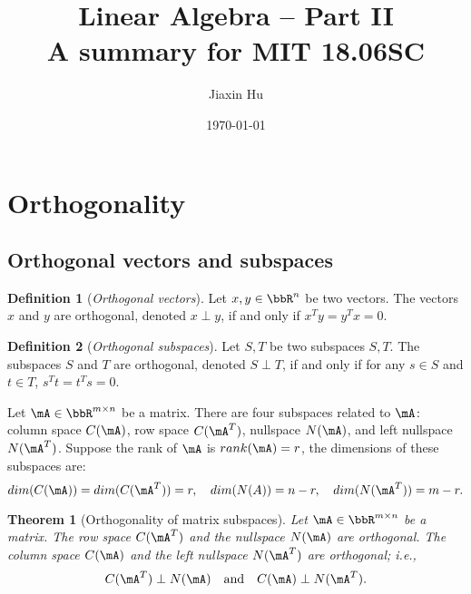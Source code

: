 \documentclass[11pt]{article}
\title{\textbf{Linear Algebra -- Part II}\\A summary for MIT 18.06SC}
\date{\today}
\author{%
Jiaxin Hu
}
\theoremstyle{plain}
\newtheorem{thm}{Theorem}[section]
\theoremstyle{definition}
\newtheorem{defn}{Definition}
\begin{document}

\maketitle


\section{Orthogonality}

\subsection{Orthogonal vectors and subspaces}
\begin{defn}[\textit{Orthogonal vectors}]\label{def:vortho}
	Let  $x,y \in \bbR^{n}$ be two vectors. The vectors $x$ and $y$ are orthogonal,  denoted $x \perp y$, if and only if $x^T y = y^T x = 0$.
\end{defn}

\begin{defn}[\textit{Orthogonal subspaces}]\label{def:sortho}
	Let  $S,T$ be two subspaces $S,T$. The subspaces $S$ and $T$ are orthogonal,  denoted $S \perp T$, if and only if for any $s \in S$ and $ t \in T$, $s^T t = t^T s = 0$.
\end{defn}

Let $\mA \in \bbR^{m \times n}$ be a matrix. There are four subspaces related to $\mA\colon$ column space $C(\mA)$, row space $C(\mA^T)$, nullspace $N(\mA)$, and left nullspace $N(\mA^T)$. Suppose the rank of $\mA$ is $rank(\mA) = r$, the dimensions of these subspaces are: 
\[ dim(C(\mA)) = dim(C(\mA^T)) = r,\quad  dim(N(A)) = n-r,\quad dim(N(\mA^T)) = m-r. \] 

\begin{thm}[Orthogonality of matrix subspaces]\label{thm:ortho}
	Let  $\mA \in \bbR^{m \times n}$ be a matrix. The row space $C(\mA^T)$ and the nullspace $N(\mA)$ are orthogonal. The column space $C(\mA)$ and the left nullspace $N(\mA^T)$ are orthogonal; i.e.,
	\[ C(\mA^T) \perp N(\mA)\quad  \text{and} \quad C(\mA) \perp N(\mA^T).  \]
\end{thm}
\end{document}
